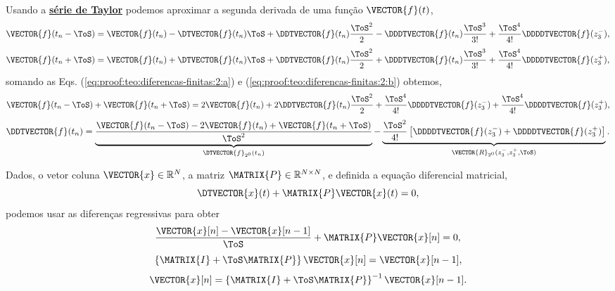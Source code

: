 \begin{myproofT}\label{proof:teo:diferenças-finitas:2}
Usando a \hyperref[def:taylor]{\textbf{série de Taylor}} podemos aproximar 
a segunda derivada de uma função $\VECTOR{f}(t)$,
\begin{equation}\label{eq:proof:teo:diferencas-finitas:2:a}
\VECTOR{f}(t_n-\ToS) = 
\VECTOR{f}(t_n)-\DTVECTOR{f}(t_n)\ToS +\DDTVECTOR{f}(t_n) \frac{\ToS^2}{2}-\DDDTVECTOR{f}(t_n) \frac{\ToS^3}{3!} +\frac{\ToS^4}{4!}\DDDDTVECTOR{f}(z_{3}^{-}),
\end{equation}
\begin{equation}\label{eq:proof:teo:diferencas-finitas:2:b}
\VECTOR{f}(t_n+\ToS) = 
\VECTOR{f}(t_n)+\DTVECTOR{f}(t_n)\ToS +\DDTVECTOR{f}(t_n) \frac{\ToS^2}{2}+\DDDTVECTOR{f}(t_n) \frac{\ToS^3}{3!} +\frac{\ToS^4}{4!}\DDDDTVECTOR{f}(z_{3}^{+}),
\end{equation}
somando as Eqs. (\ref{eq:proof:teo:diferencas-finitas:2:a}) e (\ref{eq:proof:teo:diferencas-finitas:2:b}) obtemos,
\begin{equation}
\VECTOR{f}(t_n-\ToS) + \VECTOR{f}(t_n+\ToS) = 2 \VECTOR{f}(t_n)+2\DDTVECTOR{f}(t_n) \frac{\ToS^2}{2}+\frac{\ToS^4}{4!}\DDDDTVECTOR{f}(z_{3}^{-}) +\frac{\ToS^4}{4!}\DDDDTVECTOR{f}(z_{3}^{+}),
\end{equation}
\begin{equation}
 \DDTVECTOR{f}(t_n) =
\underbrace{\frac{\VECTOR{f}(t_n-\ToS) -2 \VECTOR{f}(t_n) + \VECTOR{f}(t_n+\ToS)}{\ToS^2}}_{\DTVECTOR{f}_{2^{0}}(t_n)}
-\underbrace{\frac{\ToS^2}{4!}\left[\DDDDTVECTOR{f}(z_{3}^{-}) +\DDDDTVECTOR{f}(z_{3}^{+})\right]}_{\VECTOR{R}_{2^{0}}(z_{3}^{-},z_{3}^{+},\ToS)}.
\end{equation}
\end{myproofT}



\begin{myproofT}\label{proof:theo:differential-eq-discreto:order1:0}
Dados, o vetor coluna $\VECTOR{x} \in \mathbb{R}^N$, a matriz $\MATRIX{P} \in \mathbb{R}^{N\times N}$, 
e definida a equação diferencial matricial,
\begin{equation}
\DTVECTOR{x}(t) + \MATRIX{P} \VECTOR{x}(t)=0,
\end{equation}
podemos usar as diferenças regressivas para obter
\begin{equation}
\frac{\VECTOR{x}[n]-\VECTOR{x}[n-1]}{\ToS} + \MATRIX{P} \VECTOR{x}[n]=0,
\end{equation}
\begin{equation}
\left\{\MATRIX{I}  + \ToS \MATRIX{P}\right\} \VECTOR{x}[n]=\VECTOR{x}[n-1],
\end{equation}
\begin{equation}
\VECTOR{x}[n]=\left\{\MATRIX{I}  + \ToS \MATRIX{P}\right\}^{-1}\VECTOR{x}[n-1].
\end{equation}
\end{myproofT}


